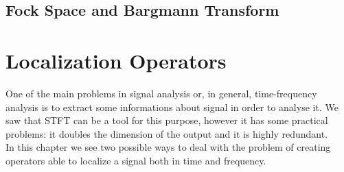 \documentclass[corpo=11pt, stile=classica, tipotesi=custom,
greek, evenboxes, english]{toptesi}
\numberwithin{equation}{chapter}
\begin{document}
\section{Fock Space and Bargmann Transform}\label{section Fock Space and Bargmann transform}


\chapter{Localization Operators}\label{chapter localization operators}
{\color{red}One of the main problems in signal analysis or, in general, time-frequency analysis is to extract some informations about signal in order to analyse it. We saw that STFT can be a tool for this purpose, however it has some practical problems: it doubles the dimension of the output and it is highly redundant.}\\
In this chapter we see two possible ways to deal with the problem of creating operators able to localize a signal both in time and frequency.
\end{document}
